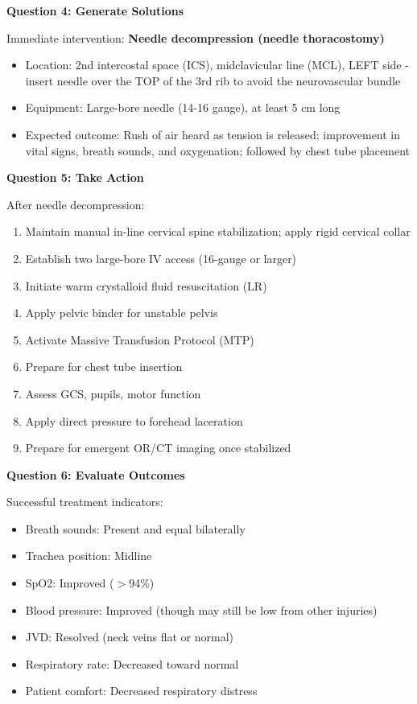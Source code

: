 \documentclass[11pt]{article}
\begin{document}
\vspace{0.5cm}
\textbf{Question 4: Generate Solutions}

Immediate intervention: \textbf{Needle decompression (needle thoracostomy)}

\begin{itemize}
    \item Location: 2nd intercostal space (ICS), midclavicular line (MCL), LEFT side - insert needle over the TOP of the 3rd rib to avoid the neurovascular bundle
    \item Equipment: Large-bore needle (14-16 gauge), at least 5 cm long
    \item Expected outcome: Rush of air heard as tension is released; improvement in vital signs, breath sounds, and oxygenation; followed by chest tube placement
\end{itemize}

\vspace{0.5cm}
\textbf{Question 5: Take Action}

After needle decompression:
\begin{enumerate}
    \item Maintain manual in-line cervical spine stabilization; apply rigid cervical collar
    \item Establish two large-bore IV access (16-gauge or larger)
    \item Initiate warm crystalloid fluid resuscitation (LR)
    \item Apply pelvic binder for unstable pelvis
    \item Activate Massive Transfusion Protocol (MTP)
    \item Prepare for chest tube insertion
    \item Assess GCS, pupils, motor function
    \item Apply direct pressure to forehead laceration
    \item Prepare for emergent OR/CT imaging once stabilized
\end{enumerate}

\vspace{0.5cm}
\textbf{Question 6: Evaluate Outcomes}

Successful treatment indicators:
\begin{itemize}
    \item Breath sounds: Present and equal bilaterally
    \item Trachea position: Midline
    \item SpO2: Improved ($>$94\%)
    \item Blood pressure: Improved (though may still be low from other injuries)
    \item JVD: Resolved (neck veins flat or normal)
    \item Respiratory rate: Decreased toward normal
    \item Patient comfort: Decreased respiratory distress
\end{itemize}
\end{document}
